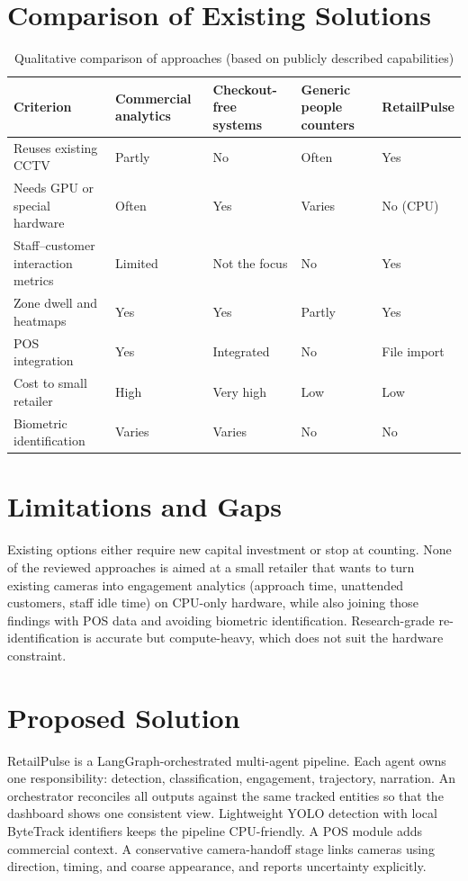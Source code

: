 \section{Comparison of Existing Solutions}
\begin{table}[H]
\centering
\caption{Qualitative comparison of approaches (based on publicly described capabilities)}
\begin{tabular}{P{0.24\textwidth}P{0.17\textwidth}P{0.17\textwidth}P{0.17\textwidth}P{0.15\textwidth}}
\toprule
Criterion & Commercial analytics & Checkout-free systems & Generic people counters & RetailPulse\\
\midrule
Reuses existing CCTV & Partly & No & Often & Yes\\
Needs GPU or special hardware & Often & Yes & Varies & No (CPU)\\
Staff--customer interaction metrics & Limited & Not the focus & No & Yes\\
Zone dwell and heatmaps & Yes & Yes & Partly & Yes\\
POS integration & Yes & Integrated & No & File import\\
Cost to small retailer & High & Very high & Low & Low\\
Biometric identification & Varies & Varies & No & No\\
\bottomrule
\end{tabular}
\end{table}

\section{Limitations and Gaps}
Existing options either require new capital investment or stop at counting. None of the reviewed approaches is aimed at a small retailer that wants to turn existing cameras into engagement analytics (approach time, unattended customers, staff idle time) on CPU-only hardware, while also joining those findings with POS data and avoiding biometric identification. Research-grade re-identification is accurate but compute-heavy, which does not suit the hardware constraint.

\section{Proposed Solution}
RetailPulse is a LangGraph-orchestrated multi-agent pipeline. Each agent owns one responsibility: detection, classification, engagement, trajectory, narration. An orchestrator reconciles all outputs against the same tracked entities so that the dashboard shows one consistent view. Lightweight YOLO detection with local ByteTrack identifiers keeps the pipeline CPU-friendly. A POS module adds commercial context. A conservative camera-handoff stage links cameras using direction, timing, and coarse appearance, and reports uncertainty explicitly.

